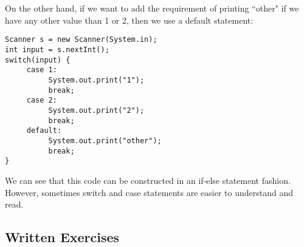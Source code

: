 \\ \\
On the other hand, if we want to add the requirement of printing ``other" if we have any other value than 1 or 2, then we use a default statement:
\begin{lstlisting}
Scanner s = new Scanner(System.in);
int input = s.nextInt();
switch(input) {
     case 1:
          System.out.print("1");
          break;
     case 2:
          System.out.print("2");
          break;
     default:
          System.out.print("other");
          break;
}
\end{lstlisting}
We can see that this code can be constructed in an if-else statement fashion. However, sometimes switch and case statements are easier to understand and read.

\subsection{Written Exercises}

